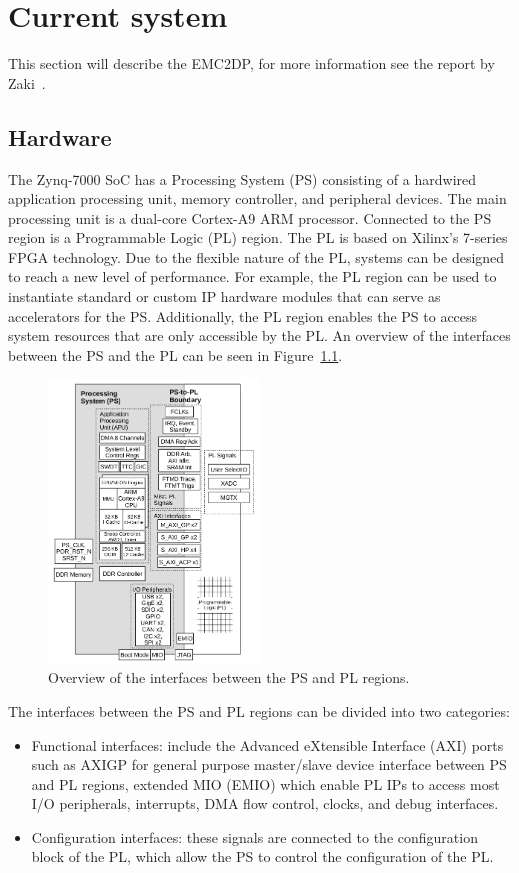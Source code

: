 \chapter{Current system}
\label{sec:lit_emc2mcs}
This section will describe the EMC2DP, for more information see the report by Zaki~\cite{zaki2016}.

\section{Hardware}
The Zynq-7000 SoC has a Processing System (PS) consisting of a hardwired application processing unit, memory controller, and peripheral devices. The main processing unit is a dual-core Cortex-A9 ARM processor. Connected to the PS region is a Programmable Logic (PL) region. The PL is based on Xilinx’s 7-series FPGA technology. 
Due to the flexible nature of the PL, systems can be designed to reach a new level of performance. For example, the PL region can be used to instantiate standard or custom IP hardware modules that can serve as accelerators for the PS. Additionally, the PL region enables the PS to access system resources that are only accessible by the PL. %
An overview of the interfaces between the PS and the PL can be seen in Figure~\ref{fig:interface}.

\begin{figure}[H]
\centering
\includegraphics[width=0.5\textwidth]{./img/literature_interface.png}
\caption{Overview of the interfaces between the PS and PL regions.\cite{zaki2016}}\label{fig:interface}
\end{figure}

The interfaces between the PS and PL regions can be divided into two categories: 
\begin{itemize}
\item Functional interfaces: include the Advanced eXtensible Interface (AXI) ports such as AXIGP for general purpose master/slave device interface between PS and PL regions, extended MIO (EMIO) which enable PL IPs to access most I/O peripherals, interrupts, DMA flow control, clocks, and debug interfaces.
\item Configuration interfaces: these signals are connected to the configuration block of the PL, which allow the PS to control the configuration of the PL. %
\end{itemize}

